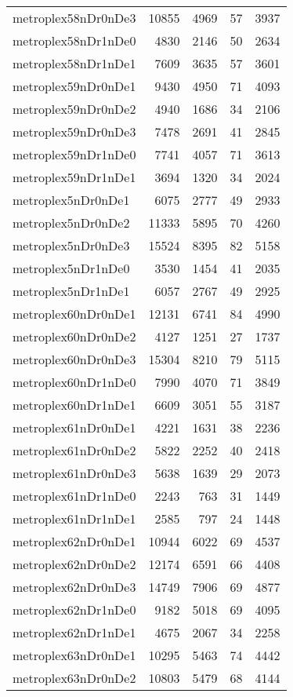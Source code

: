 \begin{longtable}{lrrrr}
metroplex58nDr0nDe3 & 10855 & 4969 & 57 & 3937 \\
metroplex58nDr1nDe0 & 4830 & 2146 & 50 & 2634 \\
metroplex58nDr1nDe1 & 7609 & 3635 & 57 & 3601 \\
metroplex59nDr0nDe1 & 9430 & 4950 & 71 & 4093 \\
metroplex59nDr0nDe2 & 4940 & 1686 & 34 & 2106 \\
metroplex59nDr0nDe3 & 7478 & 2691 & 41 & 2845 \\
metroplex59nDr1nDe0 & 7741 & 4057 & 71 & 3613 \\
metroplex59nDr1nDe1 & 3694 & 1320 & 34 & 2024 \\
metroplex5nDr0nDe1 & 6075 & 2777 & 49 & 2933 \\
metroplex5nDr0nDe2 & 11333 & 5895 & 70 & 4260 \\
metroplex5nDr0nDe3 & 15524 & 8395 & 82 & 5158 \\
metroplex5nDr1nDe0 & 3530 & 1454 & 41 & 2035 \\
metroplex5nDr1nDe1 & 6057 & 2767 & 49 & 2925 \\
metroplex60nDr0nDe1 & 12131 & 6741 & 84 & 4990 \\
metroplex60nDr0nDe2 & 4127 & 1251 & 27 & 1737 \\
metroplex60nDr0nDe3 & 15304 & 8210 & 79 & 5115 \\
metroplex60nDr1nDe0 & 7990 & 4070 & 71 & 3849 \\
metroplex60nDr1nDe1 & 6609 & 3051 & 55 & 3187 \\
metroplex61nDr0nDe1 & 4221 & 1631 & 38 & 2236 \\
metroplex61nDr0nDe2 & 5822 & 2252 & 40 & 2418 \\
metroplex61nDr0nDe3 & 5638 & 1639 & 29 & 2073 \\
metroplex61nDr1nDe0 & 2243 & 763 & 31 & 1449 \\
metroplex61nDr1nDe1 & 2585 & 797 & 24 & 1448 \\
metroplex62nDr0nDe1 & 10944 & 6022 & 69 & 4537 \\
metroplex62nDr0nDe2 & 12174 & 6591 & 66 & 4408 \\
metroplex62nDr0nDe3 & 14749 & 7906 & 69 & 4877 \\
metroplex62nDr1nDe0 & 9182 & 5018 & 69 & 4095 \\
metroplex62nDr1nDe1 & 4675 & 2067 & 34 & 2258 \\
metroplex63nDr0nDe1 & 10295 & 5463 & 74 & 4442 \\
metroplex63nDr0nDe2 & 10803 & 5479 & 68 & 4144 \\

\end{longtable}

